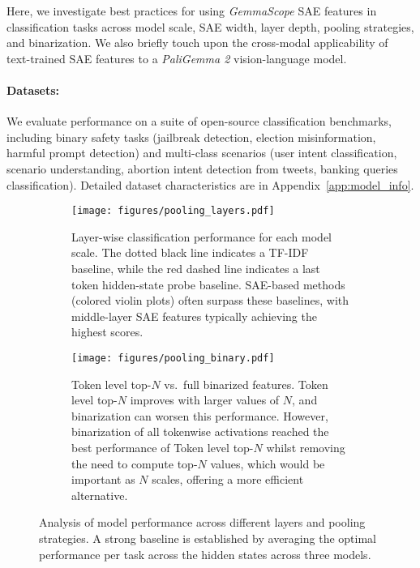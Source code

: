 Here, we investigate best practices for using \emph{GemmaScope} SAE features in classification tasks across model scale, SAE width, layer depth, pooling strategies, and binarization. We also briefly touch upon the cross-modal applicability of text-trained SAE features to a \emph{PaliGemma 2} vision-language model.

\paragraph{Datasets:}
We evaluate performance on a suite of open-source classification benchmarks, including binary safety tasks (jailbreak detection, election misinformation, harmful prompt detection) and multi-class scenarios (user intent classification, scenario understanding, abortion intent detection from tweets, banking queries classification).  Detailed dataset characteristics are in Appendix~\ref{app:model_info}.

\begin{figure}[t]
    \centering
    \begin{subfigure}[b]{\linewidth}
        \centering
        \texttt{[image: figures/pooling\_layers.pdf]}
        \caption{Layer-wise classification performance for each model scale. The dotted black line indicates a TF-IDF baseline, while the red dashed line indicates a last token hidden-state probe baseline. SAE-based methods (colored violin plots) often surpass these baselines, with middle-layer SAE features typically achieving the highest scores.}
        \label{fig:pooling_a}
    \end{subfigure}
    
    \begin{subfigure}[b]{\linewidth}
        \centering
        \texttt{[image: figures/pooling\_binary.pdf]}
        \caption{Token level top-$N$ vs.\ full binarized features. Token level top-$N$ improves with larger values of $N$, and binarization can worsen this performance. However, binarization of all tokenwise activations reached the best performance of Token level top-$N$ whilst removing the need to compute top-$N$ values, which would be important as $N$ scales, offering a more efficient alternative.}
        \label{fig:pooling_b}
    \end{subfigure}
    \caption{Analysis of model performance across different layers and pooling strategies. A strong baseline is established by averaging the optimal performance per task across the hidden states across three models.}
    \label{fig:pooling}
\end{figure}

